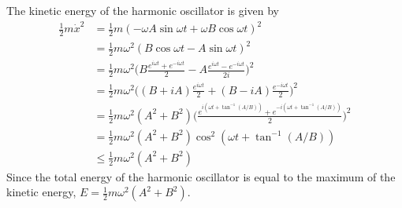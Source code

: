 \documentclass[../principles-of-quantum-mechanics.tex]{subfiles}
\begin{document}
\begin{questions}
		\begin{solution}
			The kinetic energy of the harmonic oscillator is given by
			\begin{align*}
				\frac{1}{2}m\dot{x}^2 &= \frac{1}{2}m(-\omega A\sin\omega t + \omega B\cos\omega t)^2 \\
				&= \frac{1}{2}m\omega^2(B\cos\omega t - A\sin\omega t)^2 \\
				&= \frac{1}{2}m\omega^2\Big(B\frac{e^{i\omega t} + e^{-i\omega t}}{2} - A\frac{e^{i \omega t} - e^{-i\omega t}}{2i}\Big)^2 \\
				&= \frac{1}{2}m\omega^2\Big((B + iA)\frac{e^{i\omega t}}{2} + (B - iA)\frac{e^{-i\omega t}}{2}\Big)^2 \\
				&= \frac{1}{2}m\omega^2(A^2 + B^2)\Big(\frac{e^{i(\omega t + \tan^{-1}(A/B))} + e^{-i(\omega t + \tan^{-1}(A/B))}}{2}\Big)^2 \\
				&= \frac{1}{2}m\omega^2(A^2+B^2)\cos^2(\omega t + \tan^{-1}(A/B)) \\
				&\leq \frac{1}{2}m\omega^2(A^2+B^2)
			\end{align*}
			Since the total energy of the harmonic oscillator is equal to the maximum of the kinetic energy, $E = \frac{1}{2}m\omega^2(A^2+B^2)$.
			

\end{solution}
\end{questions}
\end{document}
